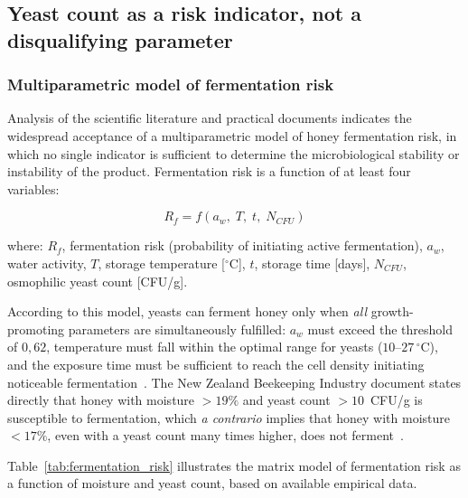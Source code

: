 \subsection{Yeast count as a risk indicator, not a disqualifying parameter}

\subsubsection{Multiparametric model of fermentation risk}

Analysis of the scientific literature and practical documents
indicates the widespread acceptance of a multiparametric model
of honey fermentation risk, in which no single indicator is
sufficient to determine the microbiological stability or
instability of the product. Fermentation risk is a function
of at least four variables:

\begin{equation}
R_f = f\!\left(a_w,\; T,\; t,\; N_{CFU}\right)
\label{eq:fermentation_risk}
\end{equation}

\noindent where: $R_f$, fermentation risk (probability of initiating
active fermentation), $a_w$, water activity, $T$, storage
temperature [$^\circ$C], $t$, storage time [days],
$N_{CFU}$, osmophilic yeast count [CFU/g].

According to this model, yeasts can ferment honey only when
\emph{all} growth-promoting parameters are simultaneously fulfilled:
$a_w$ must exceed the threshold of $0{,}62$, temperature must fall
within the optimal range for yeasts ($10$--$27\,^\circ$C),
and the exposure time must be sufficient to reach the cell density
initiating noticeable fermentation~\cite{apinz2021}.
The New Zealand Beekeeping Industry document states directly that
honey with moisture $> 19\%$ and yeast count $> 10$~CFU/g is
susceptible to fermentation, which \emph{a contrario} implies
that honey with moisture $< 17\%$, even with a yeast count many
times higher, does not ferment~\cite{apinz2021}.

Table~\ref{tab:fermentation_risk} illustrates the matrix model
of fermentation risk as a function of moisture and yeast count,
based on available empirical data.


